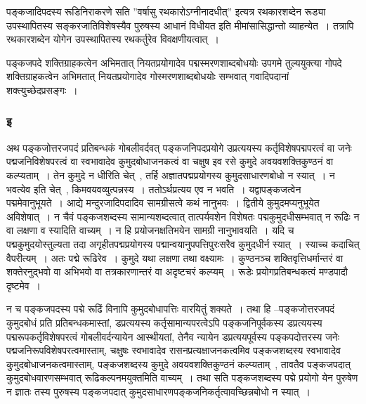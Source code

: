				पङ्कजादिपदस्य रूडिनिराकरणे सति  ”वर्षासु रथकारोऽग्नीनादधीत्”  इत्यत्र रथकारशब्देन रूड्या उपस्थापितस्य सङ्करजातिविशेषस्यैव पुरुषस्य आधानं विधीयत इति मीमांसासिद्धान्तो व्याहन्येत~। तत्रापि रथकारशब्देन योगेन उपस्थापितस्य रथकर्तुरेव विवक्षणीयत्वात्~।
			
				पङ्कजपदे शक्तिग्राहकत्वेन अभिमतात् नियतप्रयोगादेव पद्मस्मरणशाब्दबोधयोः उपगमे तुल्ययुक्त्या गोपदे शक्तिग्राहकत्वेन अभिमतात् नियतप्रयोगादेव गोस्मरणशाब्दबोधयोः सम्भवात् गवादिपदानां शक्त्युच्छेदप्रसङ्गः~। 
			
			\subsubsection{इ}
			
				\begin{small}
					
					अथ पङ्कजोत्तरजपदं प्रतिबन्धकं गोबलीवर्दवत् पङ्कजनिपदप्रयोगे उप्रत्ययस्य कर्तृविशेषपद्मपरत्वं वा जनेः पद्मजनिविशेषपरत्वं वा स्वभावादेव कुमुदबोधाजनकत्वं वा चक्षुष इव रसे कुमुदे अवयवशक्तिकुण्ठनं वा कल्प्यताम्~। तेन कुमुदे न धीरिति चेत्~, तर्हि अज्ञातपद्मप्रयोगस्य कुमुदसाधारणबोधो न स्यात्~। न भवत्येव इति चेत्~, किमवयवव्युत्पन्नस्य~। ततोऽर्थप्रत्यय एव न भवति~। यद्वापङ्कजत्वेन पद्ममेवानुभूयते~। आद्ये मन्दुरजादिपदादिव सामग्रीसत्वे कथं नानुभवः~। द्वितीये कुमुदमप्यनुभूयेत अविशेषात्~। न चैवं पङ्कजशब्दस्य  सामान्यशब्दत्वात् तात्पर्यवशेन विशेषतः पद्मकुमुदधीसम्भवात् न रूढिः न वा लक्षणा व स्यादिति वाच्यम्~। न हि प्रयोजनक्षतिभयेन सामग्री नानुभावयति~। यदि च पद्मकुमुदयोस्तुल्यता तदा अगृहीतपद्मप्रयोगस्य पद्मान्वयानुपपत्तिपुरःसरैव कुमुदधीर्न स्यात्~। स्याच्च कदाचित् वैपरीत्यम्~। अतः पद्मे रूढिरेव~। कुमुदे यथा लक्षणा तथा वक्ष्यामः~। कुण्ठनञ्च शक्तिवृत्तिधर्मान्तरं वा शक्तेरनुद्भवो वा अभिभवो वा तत्रकारणान्तरं वा अदृष्टचरं कल्प्यम्~। रूडेः प्रयोगप्रतिबन्धकत्वं मण्डपादौ दृष्टमेव~। 
				\end{small}
			
				न च पङ्कजपदस्य पद्मे रूढिं विनापि कुमुदबोधापत्तिः वारयितुं शक्यते~। तथा हि –पङ्कजोत्तरजपदं कुमुदबोधं प्रति प्रतिबन्धकमास्तां, डप्रत्ययस्य कर्तृसामान्यपरत्वेऽपि पङ्कजनिपूर्वकस्य  डप्रत्ययस्य  पद्मरूपकर्तृविशेषपरत्वं गोबलीवर्दन्यायेन आस्थीयतां, तेनैव न्यायेन  डप्रत्ययपूर्वस्य पङ्कपदोत्तरस्य जनेः पद्मजनिरूपविशेषपरत्वमास्ताम्, चक्षुषः स्वभावादेव रासनप्रत्यक्षाजनकत्वमिव  पङ्कजशब्दस्य स्वभावादेव कुमुदबोधाजनकत्वमास्ताम्, पङ्कजशब्दस्य कुमुदे अवयवशक्तिकुण्ठनं कल्प्यताम्~, तावतैव पङ्कजपदात्  कुमुदबोधवारणसम्भवात्  रूढिकल्पनमयुक्तमिति वाच्यम्~। तथा सति पङ्कजशब्दस्य  पद्मे प्रयोगो येन पुरुषेण  न ज्ञातः तस्य पुरुषस्य पङ्कजपदात् कुमुदसाधारणपङ्कजनिकर्तृत्वावच्छिन्नबोधो न स्यात्~।
 

